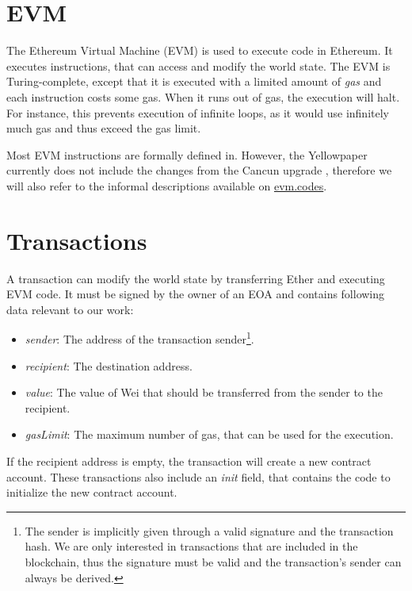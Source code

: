 \documentclass[draft,final]{vutinfth} %
\begin{document}
\section{EVM}

The Ethereum Virtual Machine (EVM) is used to execute code in Ethereum. It executes instructions, that can access and modify the world state. The EVM is Turing-complete, except that it is executed with a limited amount of \emph{gas} and each instruction costs some gas. When it runs out of gas, the execution will halt. \cite[p.14]{wood_ethereum_2024} For instance, this prevents execution of infinite loops, as it would use infinitely much gas and thus exceed the gas limit.

Most EVM instructions are formally defined in. \cite[p.30-38]{wood_ethereum_2024} However, the Yellowpaper currently does not include the changes from the Cancun upgrade \cite{noauthor_history_2024}, therefore we will also refer to the informal descriptions available on \href{https://www.evm.codes/}{evm.codes}. \cite{smlxl_evm_2024}

\section{Transactions}

A transaction can modify the world state by transferring Ether and executing EVM code. It must be signed by the owner of an EOA and contains following data relevant to our work:

\begin{itemize}
    \item \emph{sender}: The address of the transaction sender\footnote{The sender is implicitly given through a valid signature and the transaction hash. \cite[p.25-27]{wood_ethereum_2024} We are only interested in transactions that are included in the blockchain, thus the signature must be valid and the transaction's sender can always be derived.}.
    \item \emph{recipient}: The destination address.
    \item \emph{value}: The value of Wei that should be transferred from the sender to the recipient.
    \item \emph{gasLimit}: The maximum number of gas, that can be used for the execution.
\end{itemize}

If the recipient address is empty, the transaction will create a new contract account. These transactions also include an \emph{init} field, that contains the code to initialize the new contract account.
\end{document}
